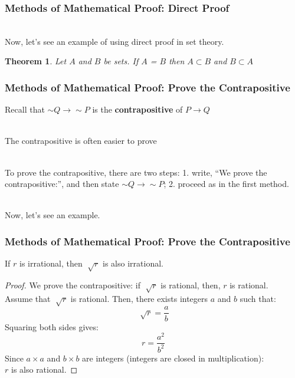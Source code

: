 \documentclass[aspectratio=169, handout]{beamer}
\newtheorem{thm}{Theorem}
\numberwithin{equation}{section}
\begin{document}
\begin{frame}
\frametitle{Methods of Mathematical Proof: Direct Proof}

\ \\Now, let's see an example of using direct proof in set theory. \pause

\begin{thm} Let $A$ and $B$ be sets.  If $A$ = $B$ then $A \subset B$ and $B \subset A$ \end{thm}
\pause
{}

\end{frame}



\begin{frame}
\frametitle{Methods of Mathematical Proof: Prove the Contrapositive}

Recall that  $\sim Q \rightarrow \sim P$ is the \textbf{contrapositive} of $P\rightarrow Q$\pause

\ \\The contrapositive is often easier to prove \pause

\ \\To prove the contrapositive, there are two steps: 1. write, ``We prove the contrapositive:'', and then state $\sim Q \rightarrow \sim P$; 2. proceed as in the first method. \pause

\ \\Now, let's see an example.

\end{frame}



\begin{frame}
\frametitle{Methods of Mathematical Proof: Prove the Contrapositive}

\begin{theorem}
If $r$ is irrational, then $\sqrt[]{r}$ is also irrational.
\end{theorem}
\pause
\begin{proof}
We prove the contrapositive: if $\sqrt[]{r}$ is rational, then, $r$ is rational. \pause \\ Assume that $\sqrt[]{r}$ is rational. Then, there exists integers $a$ and $b$ such that:
$$\sqrt[]{r} = \frac{a}{b}$$ \pause
Squaring both sides gives:
$$r = \frac{a^{2}}{b^{2}}$$ \pause
Since $a\times a $ and $b\times b$ are integers (integers are closed in multiplication):\\ $r$ is also rational.
\end{proof}

\end{frame}
\end{document}
